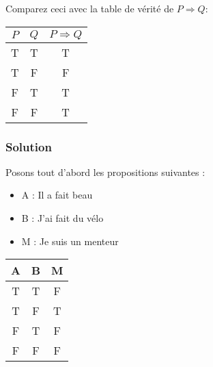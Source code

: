 Comparez ceci avec la table de vérité de $P \Rightarrow Q$:

\begin{center}
\begin{tabular}{c c | c}
$P$ & $Q$ & $P \Rightarrow Q$ \\
\hline
 T & T & T \\
 T & F & F \\
 F & T & T \\
 F & F & T
\end{tabular}
\end{center}



\subsubsection*{Solution}

    Posons tout d'abord les propositions suivantes :
    \begin{itemize}
        \item A : Il a fait beau
        \item B : J'ai fait du vélo
        \item M : Je suis un menteur
    \end{itemize}


    \begin{center}
    	\begin{tabular}{cc|c}
    		A & B & M\\
    		\hline
    		T & T & F\\
    		T & F & T\\
    		F & T & F\\
    		F & F & F\\
    	\end{tabular}
    \end{center}


%

